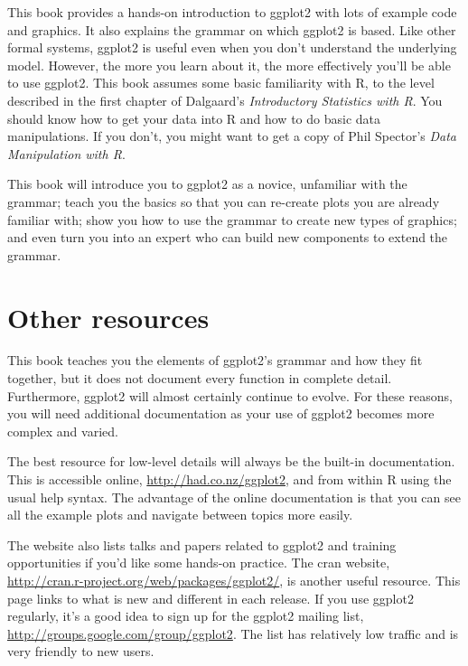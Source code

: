 This book provides a hands-on introduction to ggplot2 with lots of example code and graphics. It also explains the grammar on which ggplot2 is based. Like other formal systems, ggplot2 is useful even when you don't understand the underlying model. However, the more you learn about it, the more effectively you'll be able to use ggplot2.  This book assumes some basic familiarity with R, to the level described in the first chapter of Dalgaard’s \emph{Introductory Statistics with R}. You should know how to get your data into R and how to do basic data manipulations.  If you don't, you might want to get a copy of Phil Spector's \emph{Data Manipulation with R}.  

This book will introduce you to ggplot2 as a novice, unfamiliar with the grammar; teach you the basics so that you can re-create plots you are already familiar with; show you how to use the grammar to create new types of graphics; and even turn you into an expert who can build new components to extend the grammar.

\section{Other resources}
\label{sec:other_resources}

This book teaches you the elements of ggplot2's grammar and how they fit together, but it does not document every function in complete detail.  Furthermore, ggplot2 will almost certainly continue to evolve.  For these reasons, you will need additional documentation as your use of ggplot2 becomes more complex and varied.

The best resource for low-level details will always be the built-in documentation. This is accessible online, \url{http://had.co.nz/ggplot2}, and from within R using the usual help syntax. The advantage of the online documentation is that you can see all the example plots and navigate between topics more easily. 

The website also lists talks and papers related to ggplot2 and training opportunities if you'd like some hands-on practice. The {\sc cran} website, \url{http://cran.r-project.org/web/packages/ggplot2/}, is another useful resource. This page links to what is new and different in each release.  If you use ggplot2 regularly, it's a good idea to sign up for the ggplot2 mailing list, \url{http://groups.google.com/group/ggplot2}.  The list has relatively low traffic and is very friendly to new users. 

